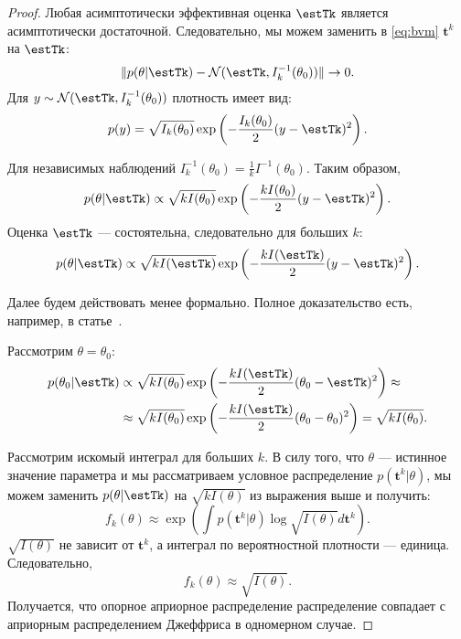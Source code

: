\begin{proof}
Любая асимптотически эффективная оценка $\estTk$ является асимптотически достаточной.
Следовательно, мы можем заменить в \eqref{eq:bvm} $\mathbf{t}^k$ на $\estTk$:
\[
\|p(\theta | \estTk) - \mathcal{N}(\estTk, I_k^{-1}(\theta_0))\| \rightarrow 0.
\]
Для $y \sim \mathcal{N}(\estTk, I_k^{-1}(\theta_0))$ плотность имеет вид:
\[
p(y) = \sqrt{I_k(\theta_0)} \exp \left(-\frac{I_k(\theta_0)}{2} (y - \estTk)^2 \right).
\]

Для независимых наблюдений $I^{-1}_k(\theta_0) = \frac{1}{k} I^{-1}(\theta_0)$.
Таким образом,
\[
p(\theta | \estTk) \propto \sqrt{k I(\theta_0)} \exp \left(-\frac{k I(\theta_0)}{2} (y - \estTk)^2 \right).
\]
Оценка $\estTk$ --- состоятельна, следовательно для больших $k$:
\[
p(\theta | \estTk) \propto \sqrt{k I(\estTk)} \exp \left(-\frac{k I(\estTk)}{2} (y - \estTk)^2 \right).
\]

Далее будем действовать менее формально.
Полное доказательство есть, например, в статье~\cite{bernardo2005reference}.

Рассмотрим $\theta = \theta_0$:
\begin{align*}
p(\theta_0 | \estTk) &\propto \sqrt{k I(\theta_0)} \exp \left(-\frac{k I(\estTk)}{2} (\theta_0 - \estTk)^2 \right) \approx \\
&\approx \sqrt{k I(\theta_0)} \exp \left(-\frac{k I(\estTk)}{2} (\theta_0 - \theta_0)^2 \right) = \sqrt{k I(\theta_0)}.
\end{align*}

Рассмотрим искомый интеграл для больших $k$.
В силу того, что $\theta$ --- истинное значение параметра и мы рассматриваем условное распределение $p(\mathbf{t}^k | \theta)$, мы можем заменить $p(\theta | \estTk)$ на $\sqrt{k I(\theta)}$ из выражения выше и получить:
\[
f_k(\theta) \approx \exp \left(\int p(\mathbf{t}^k | \theta) \log \sqrt{I(\theta)} d \mathbf{t}^k \right).
\]
$\sqrt{I(\theta)}$ не зависит от $\mathbf{t}^k$, 
а интеграл по вероятностной плотности --- единица.
Следовательно, 
\[
f_k(\theta) \approx \sqrt{I(\theta)}.
\]
Получается, что опорное априорное распределение распределение совпадает с априорным распределением Джеффриса в одномерном случае.
\end{proof}


